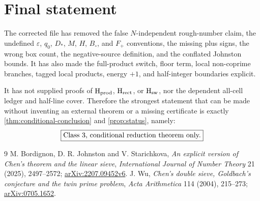 \documentclass[11pt]{article}
\theoremstyle{definition}
\newcommand{\eps}{\varepsilon}
\begin{document}
\section{Final statement}
\label{sec:final}

The corrected file has removed the false \(N\)-independent rough-number
claim, the undefined \(\eps\), \(q_0\), \(D_*\), \(M\), \(H\), \(B_\circ\),
and \(F_+\) conventions, the missing plus signs, the wrong box count, the
negative-source definition, and the conflated Johnston bounds.  It has also
made the full-product switch, floor term, local non-coprime branches,
tagged local products, energy \(+1\), and half-integer boundaries explicit.

It has not supplied proofs of \(\mathrm{H}_{\rm prod}\),
\(\mathrm{H}_{\rm rect}\), or \(\mathrm{H}_{\rm sw}\), nor the dependent
all-cell ledger and half-line cover.  Therefore the strongest statement
that can be made without inventing an external theorem or a missing
certificate is exactly \cref{thm:conditional-conclusion} and
\cref{prop:status}, namely:
\[
\boxed{\text{\rm Class 3, conditional reduction theorem only.}}
\]

\begin{thebibliography}{9}
M. Bordignon, D. R. Johnston and V. Starichkova,
\emph{An explicit version of Chen's theorem and the linear sieve},
\emph{International Journal of Number Theory} 21 (2025), 2497--2572;
\href{https://arxiv.org/abs/2207.09452}{arXiv:2207.09452v6}.
J. Wu, \emph{Chen's double sieve, Goldbach's conjecture and the twin prime
problem}, \emph{Acta Arithmetica} 114 (2004), 215--273;
\href{https://arxiv.org/abs/0705.1652}{arXiv:0705.1652}.
\end{thebibliography}
\end{document}
